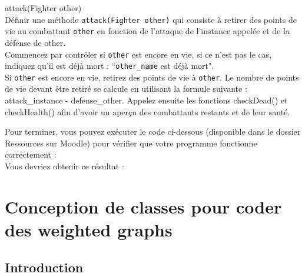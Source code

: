 \begin{Exercice}[10 minutes] attack(Fighter other)\\
    Définir une méthode \lstinline{attack(Fighter other)} qui consiste à retirer des points de vie au combattant \lstinline{other} en fonction de l'attaque de l'instance appelée et de la défense de other. \\
    
    Commencez par contrôler si \lstinline{other} est encore en vie, si ce n'est pas le cas, indiquez qu'il est déjà mort : ``\lstinline{other_name} est déjà mort". \\
    
     Si \lstinline{other} est encore en vie, retirez des points de vie à \lstinline{other}. Le nombre de points de vie devant être retiré se calcule en utilisant la formule suivante : attack\_instance - defense\_other. Appelez ensuite les fonctions checkDead() et checkHealth() afin d'avoir un aperçu des combattants restants et de leur santé.
    


\begin{solution}
	
\end{solution}
\end{Exercice}


Pour terminer, vous pouvez exécuter le code ci-dessous (disponible dans le dossier Ressources sur Moodle) pour vérifier que votre programme fonctionne correctement : \\



Vous devriez obtenir ce résultat : \\



\newpage

\section{Conception de classes pour coder des weighted graphs}

\subsection{Introduction}


